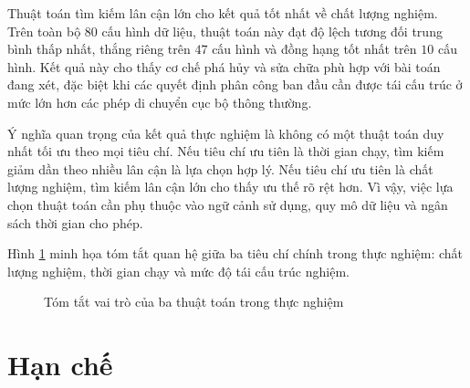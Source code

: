 Thuật toán tìm kiếm lân cận lớn cho kết quả tốt nhất về chất lượng nghiệm. Trên toàn bộ $80$ cấu hình dữ liệu, thuật toán này đạt độ lệch tương đối trung bình thấp nhất, thắng riêng trên $47$ cấu hình và đồng hạng tốt nhất trên $10$ cấu hình. Kết quả này cho thấy cơ chế phá hủy và sửa chữa phù hợp với bài toán đang xét, đặc biệt khi các quyết định phân công ban đầu cần được tái cấu trúc ở mức lớn hơn các phép di chuyển cục bộ thông thường.

Ý nghĩa quan trọng của kết quả thực nghiệm là không có một thuật toán duy nhất tối ưu theo mọi tiêu chí. Nếu tiêu chí ưu tiên là thời gian chạy, tìm kiếm giảm dần theo nhiều lân cận là lựa chọn hợp lý. Nếu tiêu chí ưu tiên là chất lượng nghiệm, tìm kiếm lân cận lớn cho thấy ưu thế rõ rệt hơn. Vì vậy, việc lựa chọn thuật toán cần phụ thuộc vào ngữ cảnh sử dụng, quy mô dữ liệu và ngân sách thời gian cho phép.

Hình \ref{fig:chapter6-summary} minh họa tóm tắt quan hệ giữa ba tiêu chí chính trong thực nghiệm: chất lượng nghiệm, thời gian chạy và mức độ tái cấu trúc nghiệm.

\begin{figure}[H]
\centering
{}
\caption{Tóm tắt vai trò của ba thuật toán trong thực nghiệm}
\label{fig:chapter6-summary}
\end{figure}

\section{Hạn chế}

